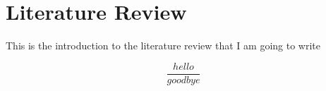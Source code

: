 \chapter{Literature Review}

This is the introduction to the literature review that I am going to write

\begin{equation}
    \frac{hello}{goodbye}
\end{equation}